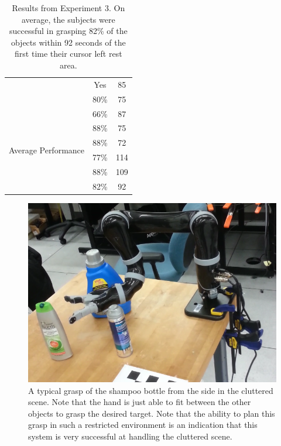\begin{table}[t]
\begin{minipage}[!t]{.4\columnwidth}
\begin{tabular}[t!]{ | c c c | }
& Yes & 85 \\ 
& 80\% & 75\\\hline 
\multirow{6}{*}{\begin{minipage}[t]{0.2\columnwidth}Average Performance\end{minipage}} & 66\% & 87 \\
& 88\% & 75 \\
& 88\% & 72 \\
& 77\% & 114 \\
& 88\% &  109\\ 
& 82\% & 92\\\hline 
\end{tabular}
\end{minipage}
\caption{Results from Experiment 3. On average, the subjects were successful in grasping 82\% of the objects within 92 seconds of the first time their cursor left rest area.}
\label{tab:results_3}
\end{table}


\begin{figure}
\includegraphics[width=\columnwidth]{images_4/semg_clutter_grasp.png}
\caption{A typical grasp of the shampoo bottle from the side in the cluttered scene. Note that the hand is just able to fit between the other objects to grasp the desired target. Note that the ability to plan this grasp in such a restricted environment is an indication that this system is very successful at handling the cluttered scene.}
\label{fig:semg-clutter-grasp}
\end{figure}


